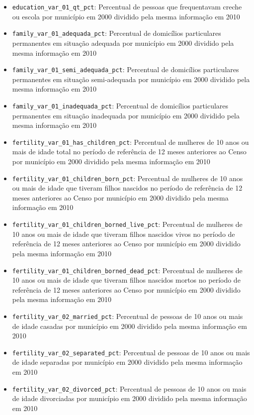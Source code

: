 \begin{itemize}
	\item \verb|education_var_01_qt_pct|: Percentual de pessoas que frequentavam creche ou escola por município em 2000 dividido pela mesma informação em 2010
	\item \verb|family_var_01_adequada_pct|: Percentual de domicílios particulares permanentes em situação adequada por município em 2000 dividido pela mesma informação em 2010
	\item \verb|family_var_01_semi_adequada_pct|: Percentual de domicílios particulares permanentes em situação semi-adequada por município em 2000 dividido pela mesma informação em 2010
	\item \verb|family_var_01_inadequada_pct|: Percentual de domicílios particulares permanentes em situação inadequada por município em 2000 dividido pela mesma informação em 2010
	\item \verb|fertility_var_01_has_children_pct|: Percentual de mulheres de 10 anos ou mais de idade total no período de referência de 12 meses anteriores ao Censo por município em 2000 dividido pela mesma informação em 2010
	\item \verb|fertility_var_01_children_born_pct|: Percentual de mulheres de 10 anos ou mais de idade que tiveram filhos nascidos no período de referência de 12 meses anteriores ao Censo por município em 2000 dividido pela mesma informação em 2010
	\item \verb|fertility_var_01_children_borned_live_pct|: Percentual de mulheres de 10 anos ou mais de idade que tiveram filhos nascidos vivos no período de referência de 12 meses anteriores ao Censo por município em 2000 dividido pela mesma informação em 2010
	\item \verb|fertility_var_01_children_borned_dead_pct|: Percentual de mulheres de 10 anos ou mais de idade que tiveram filhos nascidos mortos no período de referência de 12 meses anteriores ao Censo por município em 2000 dividido pela mesma informação em 2010
	\item \verb|fertility_var_02_married_pct|: Percentual de pessoas de 10 anos ou mais de idade casadas por município em 2000 dividido pela mesma informação em 2010
	\item \verb|fertility_var_02_separated_pct|: Percentual de pessoas de 10 anos ou mais de idade separadas por município em 2000 dividido pela mesma informação em 2010
	\item \verb|fertility_var_02_divorced_pct|: Percentual de pessoas de 10 anos ou mais de idade divorciadas por município em 2000 dividido pela mesma informação em 2010

\end{itemize}
